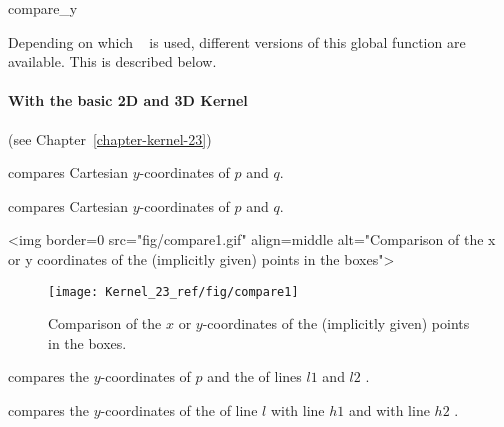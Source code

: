 \begin{ccRefFunction}{compare_y}

Depending on which \cgal\  is used,
different versions of this global function are available. This is
described below.

\paragraph{With the basic 2D and 3D Kernel} (see Chapter~\ref{chapter-kernel-23})

        {compares Cartesian $y$-coordinates of $p$ and $q$.}

        {compares Cartesian $y$-coordinates of $p$ and $q$.}

\begin{ccHtmlOnly}
<img border=0 src="fig/compare1.gif" align=middle alt="Comparison of the x 
or y coordinates of the (implicitly given) points in the boxes">
\end{ccHtmlOnly} 

\begin{ccTexOnly}
\begin{figure}[hb]
\centerline{\texttt{[image: Kernel\_23\_ref/fig/compare1]}}
\caption{Comparison of the $x$ or $y$-coordinates of the (implicitly
given) points in the boxes.\label{fig-compare13}}
\end{figure} 
\end{ccTexOnly} 

        {compares the $y$-coordinates of $p$ and the  of lines
         $l1$ and $l2$%
         .}


        {compares the $y$-coordinates of the  of line $l$
         with line $h1$ and with line $h2$%
         .}



\end{ccRefFunction}
